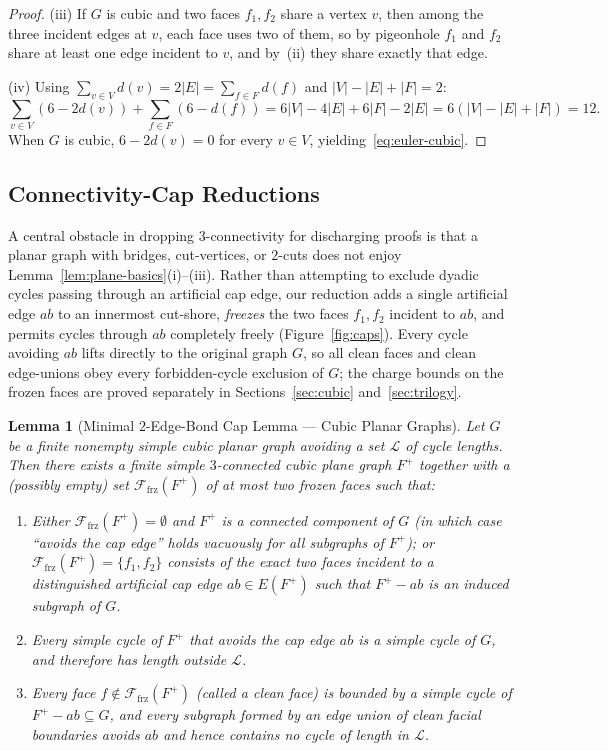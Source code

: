 \documentclass[11pt,reqno]{amsart}
\theoremstyle{plain}
\newtheorem{lemma}[theorem]{Lemma}
\theoremstyle{definition}
\theoremstyle{remark}
\newcommand{\Ffrz}{\mathcal{F}_{\mathrm{frz}}}
\DeclareRobustCommand{\_}{\ifmmode\text{\textunderscore}\else\textunderscore\allowbreak\fi}
\begin{document}
\begin{proof}
(iii) If $G$ is cubic and two faces $f_1, f_2$ share a vertex $v$, then among the three incident edges at $v$, each face uses two of them, so by pigeonhole $f_1$ and $f_2$ share at least one edge incident to $v$, and by~(ii) they share exactly that edge.

(iv) Using $\sum_{v \in V} d(v) = 2|E| = \sum_{f \in F} d(f)$ and $|V| - |E| + |F| = 2$:
\[
  \sum_{v \in V}(6 - 2 d(v)) + \sum_{f \in F}(6 - d(f))
  = 6|V| - 4|E| + 6|F| - 2|E|
  = 6(|V| - |E| + |F|) = 12.
\]
When $G$ is cubic, $6 - 2 d(v) = 0$ for every $v \in V$, yielding~\eqref{eq:euler-cubic}.
\end{proof}

\subsection{Connectivity-Cap Reductions}\label{subsec:caps}

A central obstacle in dropping $3$-connectivity for discharging proofs is that a planar graph with bridges, cut-vertices, or $2$-cuts does not enjoy Lemma~\ref{lem:plane-basics}(i)--(iii). Rather than attempting to exclude dyadic cycles passing through an artificial cap edge, our reduction adds a single artificial edge $ab$ to an innermost cut-shore, \emph{freezes} the two faces $f_1, f_2$ incident to $ab$, and permits cycles through $ab$ completely freely (Figure~\ref{fig:caps}). Every cycle avoiding $ab$ lifts directly to the original graph $G$, so all clean faces and clean edge-unions obey every forbidden-cycle exclusion of $G$; the charge bounds on the frozen faces are proved separately in Sections~\ref{sec:cubic} and~\ref{sec:trilogy}.

\begin{lemma}[Minimal $2$-Edge-Bond Cap Lemma --- Cubic Planar Graphs]\label{lem:cubic-cap}
Let $G$ be a finite nonempty simple cubic planar graph avoiding a set $\mathcal{L}$ of cycle lengths. Then there exists a finite simple $3$-connected cubic plane graph $F^+$ together with a (possibly empty) set $\Ffrz(F^+)$ of at most two \emph{frozen} faces such that:
\begin{enumerate}[label=(\roman*),leftmargin=2.2em]
  \item Either $\Ffrz(F^+) = \emptyset$ and $F^+$ is a connected component of $G$ (in which case ``avoids the cap edge'' holds vacuously for all subgraphs of $F^+$); or $\Ffrz(F^+) = \{f_1, f_2\}$ consists of the exact two faces incident to a distinguished artificial \emph{cap edge} $ab \in E(F^+)$ such that $F^+ - ab$ is an induced subgraph of $G$.
  \item Every simple cycle of $F^+$ that avoids the cap edge $ab$ is a simple cycle of $G$, and therefore has length outside $\mathcal{L}$.
  \item Every face $f \notin \Ffrz(F^+)$ (called a \emph{clean} face) is bounded by a simple cycle of $F^+ - ab \subseteq G$, and every subgraph formed by an edge union of clean facial boundaries avoids $ab$ and hence contains no cycle of length in $\mathcal{L}$.
\end{enumerate}
\end{lemma}
\end{document}

